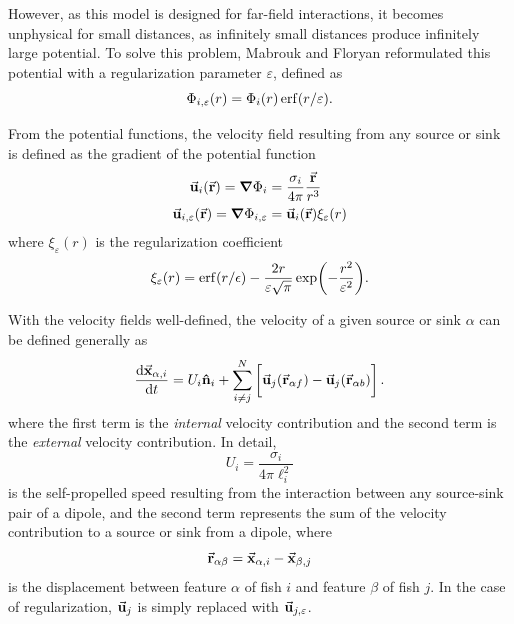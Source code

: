 \documentclass[letterpaper, 10pt, twoside]{LTJournalArticle}
\begin{document}
However, as this model is designed for far-field interactions, it becomes
unphysical for small distances, as infinitely small distances produce
infinitely large potential. To solve this problem, Mabrouk and Floryan
reformulated this potential with a regularization parameter
$\varepsilon$\footnotemark, defined as
\begin{equation}\label{eq-greens-regularized}
  \Phi_{i,\varepsilon}(r) = \Phi_{i}(r) \erf(r/\varepsilon).
\end{equation}


From the potential functions, the velocity field resulting from any source or
sink is defined as the gradient of the potential function
\begin{align}\label{eqs-velocity-field}
  \va{u}_{i}(\va{r}) = \grad \Phi_i &= \frac{\sigma_i}{4\pi} \frac{\va{r}}{r^3} \\
  \va{u}_{i,\varepsilon}(\va{r}) = \grad \Phi_{i,\varepsilon} &= \va{u}_{i}(\va{r}) \xi_{\varepsilon}(r)
\end{align}
where $\xi_{\varepsilon}(r)$ is the regularization coefficient
\begin{equation}\label{eq-regularization}
  \xi_{\varepsilon}(r) = \erf(r/\epsilon) -
  \frac{2r}{\varepsilon \sqrt{\pi}} \exp(-\frac{r^2}{\varepsilon^2}).
\end{equation}

With the velocity fields well-defined, the velocity of a given source or sink
$\alpha$ can be defined generally as
\begin{equation}\label{eq-feature-velocity}
  \dv{\va{x}_{\alpha,i}}{t} = U_i \vu{n}_i +
  \sum_{i \neq j}^N \left[ \bigg. \va{u}_j(\va{r}_{\alpha f}) -
    \va{u}_j(\va{r}_{\alpha b}) \right].
\end{equation}
 where the first term is the \textit{internal} velocity contribution and the
second term is the \textit{external} velocity contribution. In detail,
\begin{equation}\label{eq-internal-velocity-contrib}
  U_i = \frac{\sigma_i}{4\pi \ell_i^2}
\end{equation}
is the self-propelled speed resulting from the interaction between any
source-sink pair of a dipole, and the second term represents the sum of the
velocity contribution to a source or sink from a dipole, where
\begin{equation}\label{eq-}
  \va{r}_{\alpha \beta} = \va{x}_{\alpha,i} - \va{x}_{\beta,j}
\end{equation}
is the displacement between feature $\alpha$ of fish $i$ and feature $\beta$
of fish $j$. In the case of regularization, $\va{u}_j$ is simply replaced with
$\va{u}_{j,\varepsilon}$.
\end{document}
